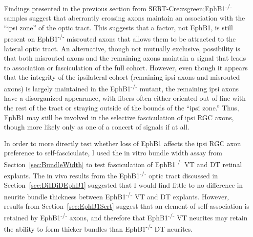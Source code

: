 \label{sec:EphB1invitro}
Findings presented in the previous section from SERT-Cre:zsgreen;EphB1\textsuperscript{-/-} samples suggest that aberrantly crossing axons maintain an association with the ``ipsi zone'' of the optic tract.
This suggests that a factor, not EphB1, is still present on EphB1\textsuperscript{-/-} misrouted axons that allows them to be attracted to the lateral optic tract.
An alternative, though not mutually exclusive, possibility is that both misrouted axons and the remaining axons maintain a signal that leads to association or fasciculation of the full cohort.
However, even though it appears that the integrity of the ipsilateral cohort (remaining ipsi axons and misrouted axons) is largely maintained in the EphB1\textsuperscript{-/-} mutant, the remaining ipsi axons have a disorganized appearance, with fibers often either oriented out of line with the rest of the tract or straying outside of the bounds of the ``ipsi zone.''
Thus, EphB1 may still be involved in the selective fasciculation of ipsi RGC axons, though more likely only as one of a concert of signals if at all.

In order to more directly test whether loss of EphB1 affects the ipsi RGC axon preference to self-fasciculate, I used the in vitro bundle width assay from Section~\ref{sec:BundleWidth} to test fasciculation of EphB1\textsuperscript{-/-} VT and DT retinal explants.
The in vivo results from the EphB1\textsuperscript{-/-} optic tract discussed in Section~\ref{sec:DiIDiDEphB1} suggested that I would find little to no difference in neurite bundle thickness between EphB1\textsuperscript{-/-} VT and DT explants.
However, results from Section~\ref{sec:EphB1Sert} suggest that an element of self-association is retained by EphB1\textsuperscript{-/-} axons, and therefore that EphB1\textsuperscript{-/-} VT neurites may retain the ability to form thicker bundles than EphB1\textsuperscript{-/-} DT neurites. 


